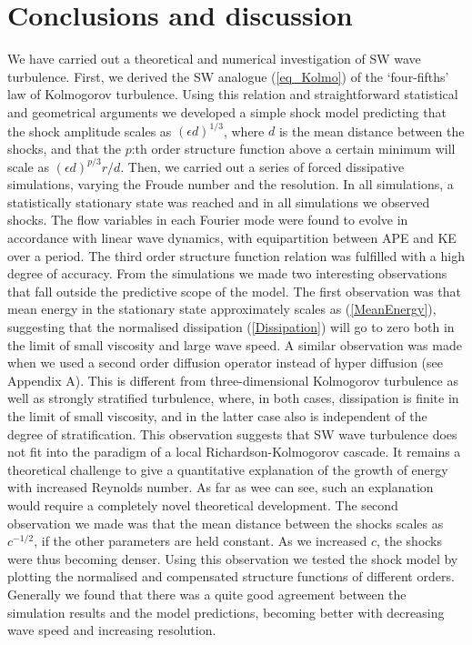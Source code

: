\section{Conclusions and discussion}

We have carried out a theoretical and numerical investigation of SW wave
turbulence. First, we derived the SW analogue (\ref{eq_Kolmo}) of the
`four-fifths' law of Kolmogorov turbulence. Using this relation and
straightforward statistical and geometrical arguments we developed a simple
shock model predicting that the shock amplitude scales as $ (\epsilon d)^{1/3}
$, where $ d $ is the mean distance between the shocks, and that the $ p $:th
order structure function above a certain minimum will scale as $ (\epsilon
d)^{p/3} r/d $. Then, we carried out a series of  forced dissipative
simulations, varying the Froude number and the resolution. In all simulations,
a statistically stationary state was reached and in all simulations we
observed shocks. The flow variables in each Fourier mode were found to evolve
in accordance with linear wave dynamics, with equipartition between APE and KE
over a period. The third order structure function relation was fulfilled with a
high degree of accuracy. From the simulations we made two interesting
observations that fall outside the predictive scope of the model. The first
observation was that mean energy in the stationary state approximately scales
as (\ref{MeanEnergy}), suggesting that the normalised dissipation
(\ref{Dissipation}) will go to zero both in the limit of small viscosity and
large wave speed. A similar observation was made when we used a second order diffusion operator instead of hyper diffusion (see Appendix A).
This is different from three-dimensional Kolmogorov
turbulence as well as strongly stratified turbulence, where, in both cases,
dissipation is finite in the limit of small viscosity, and in the latter case
also is independent of the degree of stratification. This observation suggests
that SW wave turbulence does not fit into the paradigm of a local
Richardson-Kolmogorov cascade.  It remains a theoretical challenge to give a quantitative explanation of the growth of energy with increased Reynolds number. 
As far as wee can see, such an explanation would require a completely novel theoretical development.
The second observation we made was that the mean
distance between the shocks scales as $ c^{-1/2} $, if the other parameters are
held constant. As we increased $ c $, the shocks were thus becoming denser.
Using this observation we tested the shock model by plotting the normalised and
compensated structure functions of different orders. Generally we found that
there was a quite good agreement between the simulation results and the model
predictions, becoming better with decreasing wave speed and increasing
resolution.

